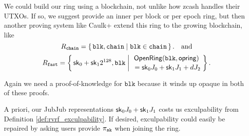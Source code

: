 \def\comblock{\ensuremath{\mathsf{comblock}}\xspace}
\newcommand\pichain{\ensuremath{\pi_{\mathtt{chain}}}\xspace}

We could build our ring using a blockchain,
 not unlike how zcash handles their UTXOs.
If so, we suggest \pifast provide an inner per block or per epoch ring,
but then another proving system like Caulk+ \cite{caulk+}
 extend this ring to the growing blockchain, like
%
$$ \baseR_{\mathtt{chain}} = \Setst{ \mathtt{blk}, \mathtt{chain} }{
	\mathtt{blk} \in \mathtt{chain}
} \mathcomma \quad\textrm{and} $$ 
%
$$ \Rfast = \Setst{ \sk_0 + \sk_1 2^{128}, \mathtt{blk} }{
	\eprint{\exists d,\openring \textrm{\ s.t.\ }}{}
	\genfrac{}{}{0pt}{}{ \OpenRing(\mathtt{blk},\openring) }{ \,\, = \sk_0 \genJ_0 + \sk_1 \genJ_1 + d \genJ_2 }
} \mathperiod $$  

Again we need a proof-of-knowledge for $\mathtt{blk}$ because it winds up opaque
 in both of these proofs. 

\smallskip

A priori, our JubJub representations $\mathsf{sk}_0 J_0 + \mathsf{sk}_1 J_1$
costs us exculpability from Definition \ref{def:rvrf_exculpability}.
If desired, exculpability could easily be repaired by asking users
provide $\pi_{\mathtt{sk}}$ when joining the ring.



\endinput


